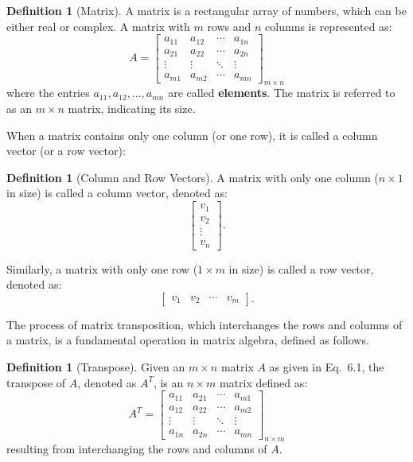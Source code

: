 \documentclass[12pt]{article}
\theoremstyle{definition}
\newtheorem{definition}[theorem]{Definition}
\begin{document}
\begin{definition}[Matrix]
    A matrix is a rectangular array of numbers, which can be either real or complex. A matrix with $m$ rows and $n$ columns is represented as:
    \[
    A = \begin{bmatrix}
    a_{11} & a_{12} & \cdots & a_{1n} \\
    a_{21} & a_{22} & \cdots & a_{2n} \\
    \vdots & \vdots & \ddots & \vdots \\
    a_{m1} & a_{m2} & \cdots & a_{mn}
    \end{bmatrix}_{m \times n}
    \]
    where the entries $a_{11}, a_{12}, \ldots, a_{mn}$ are called \textbf{elements}. The matrix is referred to as an $m \times n$ matrix, indicating its size.
\end{definition}

When a matrix contains only one column (or one row), it is called a column vector (or a row vector):

\begin{definition}[Column and Row Vectors]
    A matrix with only one column ($n \times 1$ in size) is called a column vector, denoted as:
    \[
    \begin{bmatrix}
    v_1 \\
    v_2 \\
    \vdots \\
    v_n
    \end{bmatrix} .
    \]

    Similarly, a matrix with only one row ($1 \times m$ in size) is called a row vector, denoted as:
    \[
    \begin{bmatrix}
    v_1 & v_2 & \cdots & v_m
    \end{bmatrix} .
    \]
\end{definition}

The process of matrix transposition, which interchanges the rows and columns of a matrix, is a fundamental operation in matrix algebra, defined as follows.

\begin{definition}[Transpose]
    Given an $m \times n$ matrix $A$ as given in Eq.~6.1, the transpose of $A$, denoted as $A^T$, is an $n \times m$ matrix defined as:
    \[
    A^T = \begin{bmatrix}
    a_{11} & a_{21} & \cdots & a_{m1} \\
    a_{12} & a_{22} & \cdots & a_{m2} \\
    \vdots & \vdots & \ddots & \vdots \\
    a_{1n} & a_{2n} & \cdots & a_{mn}
    \end{bmatrix}_{n \times m}
    \]
    resulting from interchanging the rows and columns of $A$.
\end{definition}
\end{document}
